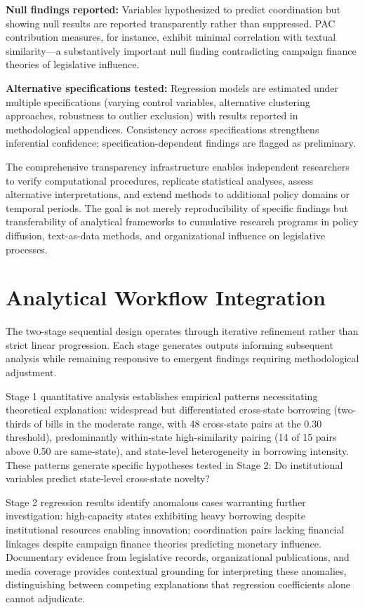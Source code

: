 \textbf{Null findings reported:} Variables hypothesized to predict coordination but showing null results are reported transparently rather than suppressed. PAC contribution measures, for instance, exhibit minimal correlation with textual similarity---a substantively important null finding contradicting campaign finance theories of legislative influence.

\textbf{Alternative specifications tested:} Regression models are estimated under multiple specifications (varying control variables, alternative clustering approaches, robustness to outlier exclusion) with results reported in methodological appendices. Consistency across specifications strengthens inferential confidence; specification-dependent findings are flagged as preliminary.

The comprehensive transparency infrastructure enables independent researchers to verify computational procedures, replicate statistical analyses, assess alternative interpretations, and extend methods to additional policy domains or temporal periods. The goal is not merely reproducibility of specific findings but transferability of analytical frameworks to cumulative research programs in policy diffusion, text-as-data methods, and organizational influence on legislative processes.

\section{Analytical Workflow Integration}

The two-stage sequential design operates through iterative refinement rather than strict linear progression. Each stage generates outputs informing subsequent analysis while remaining responsive to emergent findings requiring methodological adjustment.

Stage 1 quantitative analysis establishes empirical patterns necessitating theoretical explanation: widespread but differentiated cross-state borrowing (two-thirds of bills in the moderate range, with 48 cross-state pairs at the 0.30 threshold), predominantly within-state high-similarity pairing (14 of 15 pairs above 0.50 are same-state), and state-level heterogeneity in borrowing intensity. These patterns generate specific hypotheses tested in Stage 2: Do institutional variables predict state-level cross-state novelty?

Stage 2 regression results identify anomalous cases warranting further investigation: high-capacity states exhibiting heavy borrowing despite institutional resources enabling innovation; coordination pairs lacking financial linkages despite campaign finance theories predicting monetary influence. Documentary evidence from legislative records, organizational publications, and media coverage provides contextual grounding for interpreting these anomalies, distinguishing between competing explanations that regression coefficients alone cannot adjudicate.

